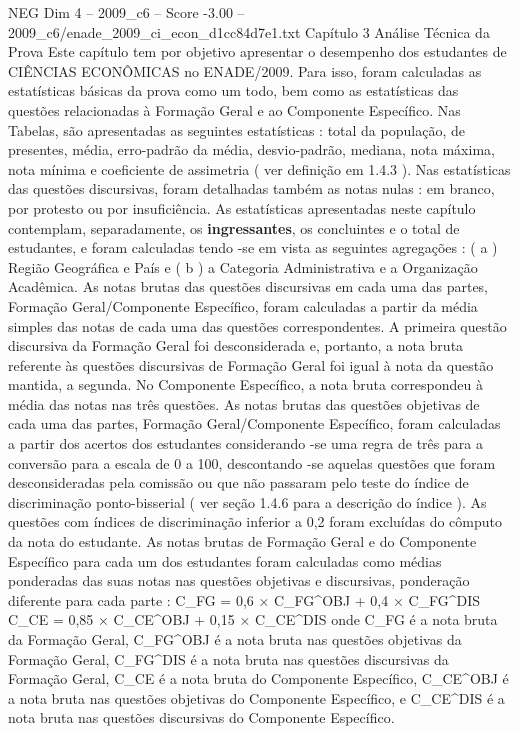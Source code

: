 \begin{textsample}{NEG Dim 4 – 2009\_c6 – Score -3.00 – 2009\_c6/enade\_2009\_ci\_econ\_d1cc84d7e1.txt}  \label{ex:f4_neg_032}
Capítulo 3 Análise Técnica da Prova Este capítulo tem por objetivo apresentar o desempenho dos estudantes de CIÊNCIAS ECONÔMICAS no ENADE/2009.
Para isso, foram calculadas as estatísticas básicas da prova como um todo, bem como as estatísticas das questões relacionadas à Formação Geral e ao Componente Específico.
Nas Tabelas, são apresentadas as seguintes estatísticas : total da população, de presentes, média, erro-padrão da média, desvio-padrão, mediana, nota máxima, nota mínima e coeficiente de assimetria ( ver definição em 1.4.3 ).
Nas estatísticas das questões discursivas, foram detalhadas também as notas nulas : em branco, por protesto ou por insuficiência.
As estatísticas apresentadas neste capítulo contemplam, separadamente, os \textbf{ingressantes}, os concluintes e o total de estudantes, e foram calculadas tendo -se em vista as seguintes agregações : ( a ) Região Geográfica e País e ( b ) a Categoria Administrativa e a Organização Acadêmica.
As notas brutas das questões discursivas em cada uma das partes, Formação Geral/Componente Específico, foram calculadas a partir da média simples das notas de cada uma das questões correspondentes.
A primeira questão discursiva da Formação Geral foi desconsiderada e, portanto, a nota bruta referente às questões discursivas de Formação Geral foi igual à nota da questão mantida, a segunda.
No Componente Específico, a nota bruta correspondeu à média das notas nas três questões.
As notas brutas das questões objetivas de cada uma das partes, Formação Geral/Componente Específico, foram calculadas a partir dos acertos dos estudantes considerando -se uma regra de três para a conversão para a escala de 0 a 100, descontando -se aquelas questões que foram desconsideradas pela comissão ou que não passaram pelo teste do índice de discriminação ponto-bisserial ( ver seção 1.4.6 para a descrição do índice ).
As questões com índices de discriminação inferior a 0,2 foram excluídas do cômputo da nota do estudante.
As notas brutas de Formação Geral e do Componente Específico para cada um dos estudantes foram calculadas como médias ponderadas das suas notas nas questões objetivas e discursivas, ponderação diferente para cada parte : C\_FG = 0,6 × C\_FG\textasciicircum{}OBJ + 0,4 × C\_FG\textasciicircum{}DIS C\_CE = 0,85 × C\_CE\textasciicircum{}OBJ + 0,15 × C\_CE\textasciicircum{}DIS onde C\_FG é a nota bruta da Formação Geral, C\_FG\textasciicircum{}OBJ é a nota bruta nas questões objetivas da Formação Geral, C\_FG\textasciicircum{}DIS é a nota bruta nas questões discursivas da Formação Geral, C\_CE é a nota bruta do Componente Específico, C\_CE\textasciicircum{}OBJ é a nota bruta nas questões objetivas do Componente Específico, e C\_CE\textasciicircum{}DIS é a nota bruta nas questões discursivas do Componente Específico.

\end{textsample}
